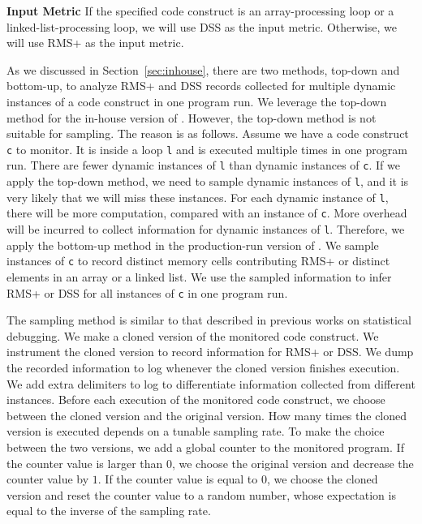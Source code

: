 \noindent\textbf{Input Metric}
If the specified code construct is an array-processing loop 
or a linked-list-processing loop,
we will use DSS as the input metric. 
Otherwise, we will use RMS+ as the input metric. 

As we discussed in Section~\ref{sec:inhouse}, 
there are two methods, top-down and bottom-up, 
to analyze RMS+ and DSS records collected 
for multiple dynamic instances of a code construct in one program run. 
We leverage the top-down method for the in-house version of \Tool. 
However, the top-down method is not suitable for sampling. 
The reason is as follows.
Assume we have a code construct \texttt{c} to monitor. 
It is inside a loop \texttt{l} and is executed multiple times in one program run.
There are fewer dynamic instances of \texttt{l}
than dynamic instances of \texttt{c}.
If we apply the top-down method, 
we need to sample dynamic instances of \texttt{l}, 
and it is very likely that we will miss these instances. 
For each dynamic instance of \texttt{l}, 
there will be more computation, 
compared with an instance of \texttt{c}.
More overhead will be incurred to collect 
information for dynamic instances of \texttt{l}.
Therefore, we apply the bottom-up method 
in the production-run version of \Tool.
We sample instances of \texttt{c} to record 
distinct memory cells contributing RMS+ 
or distinct elements in an array or a linked list.
We use the sampled information to infer RMS+ 
or DSS for all instances of \texttt{c} in one program run.


The sampling method is similar to that described in previous works on statistical 
debugging\cite{liblit03,liblit05,CCI,SongOOPSLA2014,ldoctor}.
We make a cloned version of the monitored code construct.
We instrument the cloned version to record information for RMS+ or DSS. 
We dump the recorded information to log 
whenever the cloned version finishes execution. 
We add extra delimiters to log to differentiate information collected from different instances.
Before each execution of the monitored code construct, 
we choose between the cloned version and the original version. 
How many times the cloned version is executed 
depends on a tunable sampling rate. 
To make the choice between the two versions,
we add a global counter to the monitored program. 
If the counter value is larger than $0$, 
we choose the original version and decrease the counter value by $1$.
If the counter value is equal to $0$,
we choose the cloned version and reset the counter value to 
a random number, 
whose expectation is equal to the inverse of the sampling rate.  


